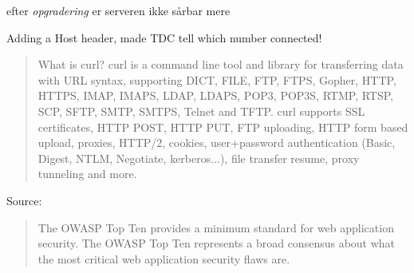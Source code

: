 \documentclass[Screen16to9,17pt]{foils}
\begin{document}


\centerline{efter \emph{opgradering} er serveren ikke sårbar mere}



Adding a Host header, made TDC tell which number connected!


\begin{quote}\footnotesize
	What is curl?
curl is a command line tool and library for transferring data with URL syntax, supporting DICT, FILE, FTP, FTPS, Gopher, HTTP, HTTPS, IMAP, IMAPS, LDAP, LDAPS, POP3, POP3S, RTMP, RTSP, SCP, SFTP, SMTP, SMTPS, Telnet and TFTP. curl supports SSL certificates, HTTP POST, HTTP PUT, FTP uploading, HTTP form based upload, proxies, HTTP/2, cookies, user+password authentication (Basic, Digest, NTLM, Negotiate, kerberos...), file transfer resume, proxy tunneling and more.
\end{quote}

Source: 




\begin{quote}
The OWASP Top Ten provides a minimum standard for web application
security. The OWASP Top Ten represents a broad consensus about what
the most critical web application security flaws are.
\end{quote}
\end{document}
